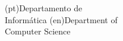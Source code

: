 





 \ntdepartment(pt){Departamento de\\Informática}
 \ntdepartment(en){Department of\\Computer Science}







